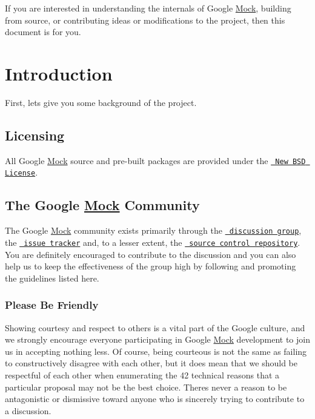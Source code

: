 If you are interested in understanding the internals of Google \mbox{\hyperlink{class_mock}{Mock}}, building from source, or contributing ideas or modifications to the project, then this document is for you.

\section*{Introduction}

First, let\textquotesingle{}s give you some background of the project.

\subsection*{Licensing}

All Google \mbox{\hyperlink{class_mock}{Mock}} source and pre-\/built packages are provided under the \href{http://www.opensource.org/licenses/bsd-license.php}\texttt{ New B\+SD License}.

\subsection*{The Google \mbox{\hyperlink{class_mock}{Mock}} Community}

The Google \mbox{\hyperlink{class_mock}{Mock}} community exists primarily through the \href{http://groups.google.com/group/googlemock}\texttt{ discussion group}, the \href{https://github.com/google/googletest/issues}\texttt{ issue tracker} and, to a lesser extent, the \href{../}\texttt{ source control repository}. You are definitely encouraged to contribute to the discussion and you can also help us to keep the effectiveness of the group high by following and promoting the guidelines listed here.

\subsubsection*{Please Be Friendly}

Showing courtesy and respect to others is a vital part of the Google culture, and we strongly encourage everyone participating in Google \mbox{\hyperlink{class_mock}{Mock}} development to join us in accepting nothing less. Of course, being courteous is not the same as failing to constructively disagree with each other, but it does mean that we should be respectful of each other when enumerating the 42 technical reasons that a particular proposal may not be the best choice. There\textquotesingle{}s never a reason to be antagonistic or dismissive toward anyone who is sincerely trying to contribute to a discussion.


